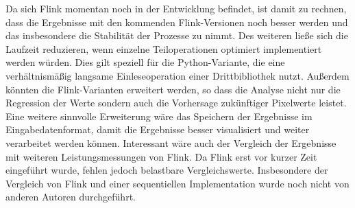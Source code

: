 Da sich Flink momentan noch in der Entwicklung befindet, ist damit zu rechnen, dass die Ergebnisse mit den kommenden Flink-Versionen noch besser werden und das insbesondere die Stabilität der Prozesse zu nimmt. Des weiteren ließe sich die Laufzeit reduzieren, wenn einzelne Teiloperationen optimiert implementiert werden würden. Dies gilt speziell für die Python-Variante, die eine verhältnismäßig langsame Einleseoperation einer Drittbibliothek nutzt. Außerdem könnten die Flink-Varianten erweitert werden, so dass die Analyse nicht nur die Regression der Werte sondern auch die Vorhersage zukünftiger Pixelwerte leistet. Eine weitere sinnvolle Erweiterung wäre das Speichern der Ergebnisse im Eingabedatenformat, damit die Ergebnisse besser visualisiert und weiter verarbeitet werden können.
Interessant wäre auch der Vergleich der Ergebnisse mit weiteren Leistungsmessungen von Flink. Da Flink erst vor kurzer Zeit eingeführt wurde, fehlen jedoch belastbare Vergleichswerte. Insbesondere der Vergleich von Flink und einer sequentiellen Implementation wurde noch nicht von anderen Autoren durchgeführt.